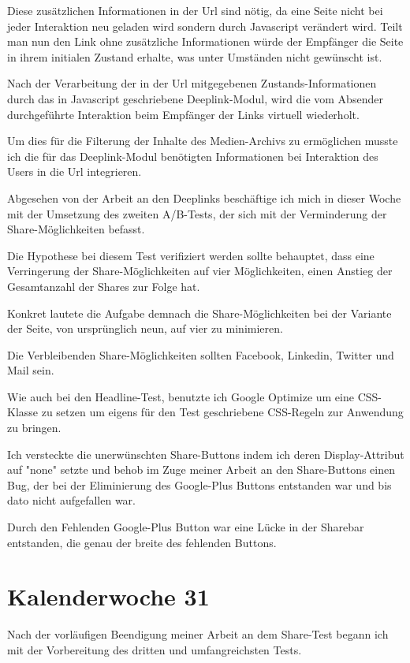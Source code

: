 \documentclass[11pt]{article} %
\begin{document}
Diese zusätzlichen Informationen in der Url sind nötig, da eine Seite nicht bei jeder Interaktion neu geladen wird sondern durch Javascript verändert wird. Teilt man nun den Link ohne zusätzliche Informationen würde der Empfänger die Seite in ihrem initialen Zustand erhalte, was unter Umständen nicht gewünscht ist.

Nach der Verarbeitung der in der Url mitgegebenen Zustands-Informationen durch das in Javascript geschriebene Deeplink-Modul, wird die vom Absender durchgeführte Interaktion beim Empfänger der Links virtuell wiederholt.

Um dies für die Filterung der Inhalte des Medien-Archivs zu ermöglichen musste ich die für das Deeplink-Modul benötigten Informationen bei Interaktion des Users in die Url integrieren.

Abgesehen von der Arbeit an den Deeplinks beschäftige ich mich in dieser Woche mit der Umsetzung des zweiten A/B-Tests, der sich mit der Verminderung der Share-Möglichkeiten befasst.

Die Hypothese bei diesem Test verifiziert werden sollte behauptet, dass eine Verringerung der Share-Möglichkeiten auf vier Möglichkeiten, einen Anstieg der Gesamtanzahl der Shares zur Folge hat.

Konkret lautete die Aufgabe demnach die Share-Möglichkeiten bei der Variante der Seite, von ursprünglich neun, auf vier zu minimieren.

Die Verbleibenden Share-Möglichkeiten sollten Facebook, Linkedin, Twitter und Mail sein.

Wie auch bei den Headline-Test, benutzte ich Google Optimize um eine CSS-Klasse zu setzen um eigens für den Test geschriebene CSS-Regeln zur Anwendung zu bringen.

Ich versteckte die unerwünschten Share-Buttons indem ich deren Display-Attribut auf "none" setzte und behob im Zuge meiner Arbeit an den Share-Buttons einen Bug, der bei der Eliminierung des Google-Plus Buttons entstanden war und bis dato nicht aufgefallen war.

Durch den Fehlenden Google-Plus Button war  eine Lücke in der Sharebar entstanden, die genau der breite des fehlenden Buttons. 

\section{Kalenderwoche 31} \label{sec:kw3}

Nach der vorläufigen Beendigung meiner Arbeit an dem Share-Test begann ich mit der Vorbereitung des dritten und umfangreichsten Tests.
\end{document}
